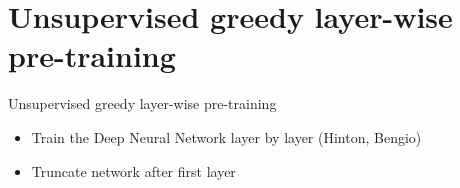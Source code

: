 \section{Unsupervised greedy layer-wise pre-training}
	
	
	\begin{frame}[t]{Unsupervised greedy layer-wise pre-training}
	
		\begin{itemize}
			\item Train the Deep Neural Network layer by layer (Hinton, Bengio)	
			\item Truncate network after first layer		
		\end{itemize}

		\begin{minipage}[t]{0.48\linewidth}
			\begin{figure}
			\end{figure}
		\end{minipage}
		
	\end{frame}
	
